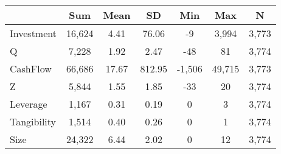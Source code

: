 {
\def\sym#1{\ifmmode^{#1}\else\(^{#1}\)\fi}
\begin{tabular}{l*{1}{cccccc}}
\hline\hline
                    &         Sum&        Mean&          SD&         Min&         Max&           N\\
\hline
Investment          &      16,624&        4.41&       76.06&          -9&       3,994&       3,773\\
Q                   &       7,228&        1.92&        2.47&         -48&          81&       3,774\\
CashFlow            &      66,686&       17.67&      812.95&      -1,506&      49,715&       3,773\\
Z                   &       5,844&        1.55&        1.85&         -33&          20&       3,774\\
Leverage            &       1,167&        0.31&        0.19&           0&           3&       3,774\\
Tangibility         &       1,514&        0.40&        0.26&           0&           1&       3,774\\
Size                &      24,322&        6.44&        2.02&           0&          12&       3,774\\
\hline\hline
\end{tabular}
}
